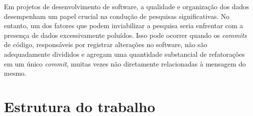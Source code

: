 Em projetos de desenvolvimento de software, a qualidade e organização dos dados desempenham um papel crucial na condução de pesquisas significativas. No entanto, um dos fatores que podem inviabilizar a pesquisa seria enfrentar com a presença de dados excessivamente poluídos. Isso pode ocorrer quando os \textit{commits} de código, responsáveis por registrar alterações no software, não são adequadamente divididos e agregam uma quantidade substancial de refatorações em um único \textit{commit}, muitas vezes não diretamente relacionadas à mensagem do mesmo.

\section{Estrutura do trabalho}
\label{sec:estruturaTrabalho}
